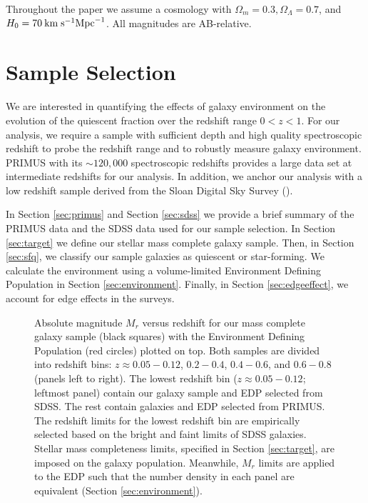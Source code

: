 \documentclass{emulateapj}
\begin{document}
Throughout the paper we assume a cosmology with $\Omega_{m} = 0.3,
\Omega_{\Lambda} = 0.7$, and $H_0 = 70 \: \rm{km} \; \rm{s}^{-1}
\rm{Mpc}^{-1}$. All magnitudes are AB-relative. 

\section{Sample Selection} \label{sec:sample}
We are interested in quantifying the effects of galaxy environment on
the evolution of the quiescent fraction over the redshift range $0 < z < 1$. For our analysis, we require a sample with sufficient depth and high quality spectroscopic redshift to probe the redshift range and to robustly measure galaxy environment. PRIMUS with its $\sim 120,000$ spectroscopic redshifts provides a large data set at intermediate redshifts for our analysis. In addition, we anchor our analysis with a low redshift sample derived from the Sloan Digital Sky Survey (\citealt{York:2000aa}). 

In Section \ref{sec:primus} and Section \ref{sec:sdss} we provide a
brief summary of the PRIMUS data and the SDSS data used for our sample
selection. In Section \ref{sec:target} we define our stellar mass complete galaxy sample.  
Then, in Section \ref{sec:sfq}, we classify our sample galaxies as quiescent or star-forming. 
We calculate the environment
using a volume-limited Environment Defining Population in Section
\ref{sec:environment}.  Finally, in Section \ref{sec:edgeeffect}, we
account for edge effects in the surveys.

\begin{figure*}
    \begin{center}
        \leavevmode
        \caption{Absolute magnitude $M_{r}$ versus redshift for our mass complete galaxy sample (black squares) with the Environment Defining Population (red circles) plotted on top. Both samples are divided into redshift bins: $z \approx 0.05-0.12$, $0.2-0.4$, $0.4-0.6$, and $0.6-0.8$ (panels left to right). The lowest redshift bin ($z \approx 0.05-0.12$; leftmost panel) contain our galaxy sample and EDP selected from SDSS. The rest contain galaxies and EDP selected from PRIMUS. The redshift limits for the lowest redshift bin are empirically selected based on the bright and faint limits of SDSS galaxies. Stellar mass completeness limits, specified in Section \ref{sec:target}, are imposed on the galaxy population. Meanwhile, $M_{r}$ limits are applied to the EDP such that the number density in each panel are equivalent (Section \ref{sec:environment}).} \label{fig:targetEDP}
    \end{center}
\end{figure*}
\end{document}
